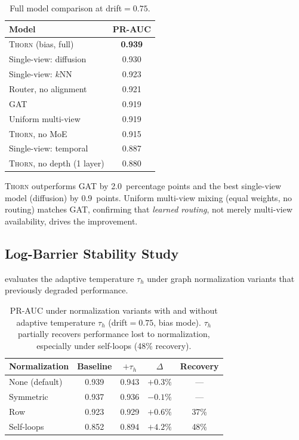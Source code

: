\documentclass[11pt,a4paper]{article}
\newcommand{\thorn}{\textsc{Thorn}}
\begin{document}
\begin{table}[t]
\centering
\caption{Full model comparison at drift${}=0.75$.}
\label{tab:baselines}
\begin{tabular}{@{}lc@{}}
\toprule
Model & PR-AUC \\
\midrule
\thorn{} (bias, full) & \textbf{0.939} \\
Single-view: diffusion & 0.930 \\
Single-view: $k$NN & 0.923 \\
Router, no alignment & 0.921 \\
GAT \citep{velickovic2018graph} & 0.919 \\
Uniform multi-view & 0.919 \\
\thorn{}, no MoE & 0.915 \\
Single-view: temporal & 0.887 \\
\thorn{}, no depth (1 layer) & 0.880 \\
\bottomrule
\end{tabular}
\end{table}

\thorn{} outperforms GAT by 2.0~percentage points and the best
single-view model (diffusion) by 0.9~points.
Uniform multi-view mixing (equal weights, no routing) matches GAT,
confirming that \emph{learned routing}, not merely multi-view
availability, drives the improvement.

\subsection{Log-Barrier Stability Study}
\label{sec:stability}

 evaluates the adaptive temperature $\tau_h$
under graph normalization variants that previously degraded performance.

\begin{table}[t]
\centering
\caption{PR-AUC under normalization variants with and without adaptive
temperature $\tau_h$ (drift${}=0.75$, bias mode).
$\tau_h$ partially recovers performance lost to normalization,
especially under self-loops (48\% recovery).}
\label{tab:stability}
\begin{tabular}{@{}lcccc@{}}
\toprule
Normalization & Baseline & $+\tau_h$ & $\Delta$ & Recovery \\
\midrule
None (default) & 0.939 & 0.943 & $+0.3\%$ & --- \\
Symmetric & 0.937 & 0.936 & $-0.1\%$ & --- \\
Row & 0.923 & 0.929 & $+0.6\%$ & 37\% \\
Self-loops & 0.852 & 0.894 & $+4.2\%$ & 48\% \\
\bottomrule
\end{tabular}
\end{table}
\end{document}
